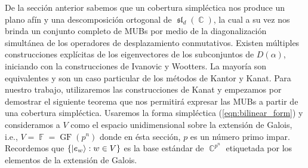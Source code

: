 \documentclass[a4paper,11pt]{report}
\DeclareMathOperator{\C}{\mathbb{C}}
\DeclareMathOperator{\F}{\mathbb{F}}
\DeclareMathOperator{\GF}{GF}
\DeclareMathOperator{\Sl}{\mathfrak{sl}}
\begin{document}
  De la sección anterior sabemos que un cobertura
  simpléctica nos produce un plano afín y una descomposición
  ortogonal de $\Sl_d(\C)$, la cual a su vez nos brinda un
  conjunto completo de MUBs por medio de la diagonalización
  simultánea de los operadores de desplazamiento
  conmutativos. Existen múltiples construcciones explícitas
  de los eigenvectores de los subconjuntos de $D(\alpha)$,
  iniciando con la construcciones de Ivanovic y Wootters. La
  mayoría son equivalentes y son un caso particular de los
  métodos de Kantor y Kanat. Para nuestro trabajo,
  utilizaremos las construcciones de Kanat y empezamos por
  demostrar el siguiente teorema que nos permitirá expresar
  las MUBs a partir de una cobertura simpléctica. Usaremos
  la forma simpléctica (\ref{eqn:bilinear_form}) y
  consideramos a $V$ como el espacio unidimensional sobre la
  extensión de Galois, i.e., $V = \F = \GF(p^{n})$ donde en
  ésta sección, $p$ es un número primo impar.  Recordemos
  que $\{\ket{e_w} : w \in V\}$ es la base estándar de
  $\C^{p^{n}}$ etiquetada por los elementos de la extensión
  de Galois.
\end{document}
